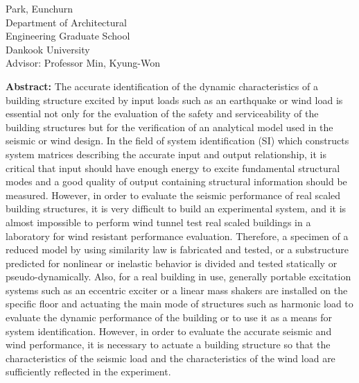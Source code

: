 \begin{center}
\end{center}
\begin{flushright}
Park, Eunchurn\\
Department of Architectural\\
Engineering Graduate School\\
Dankook University\\
\vspace{0.3cm}
Advisor: Professor Min, Kyung-Won
\end{flushright}
{\large\textbf{Abstract:}}
The accurate identification of the dynamic characteristics of a building structure excited by input loads such as an earthquake or wind load is essential not only for the evaluation of the safety and serviceability of the building structures but for the verification of an analytical model used in the seismic or wind design. In the field of system identification (SI) which constructs system matrices describing the accurate input and output relationship, it is critical that input should have enough energy to excite fundamental structural modes and a good quality of output containing structural information should be measured. However, in order to evaluate the seismic performance of real scaled building structures, it is very difficult to build an experimental system, and it is almost impossible to perform wind tunnel test real scaled buildings in a laboratory for wind resistant performance evaluation. Therefore, a specimen of a reduced model by using similarity law is fabricated and tested, or a substructure predicted for nonlinear or inelastic behavior is divided and tested statically or pseudo-dynamically. Also, for a real building in use, generally portable excitation systems such as an eccentric exciter or a linear mass shakers are installed on the specific floor and actuating the main mode of structures such as harmonic load to evaluate the dynamic performance of the building or to use it as a means for system identification. However, in order to evaluate the accurate seismic and wind performance, it is necessary to actuate a building structure so that the characteristics of the seismic load and the characteristics of the wind load are sufficiently reflected in the experiment.

